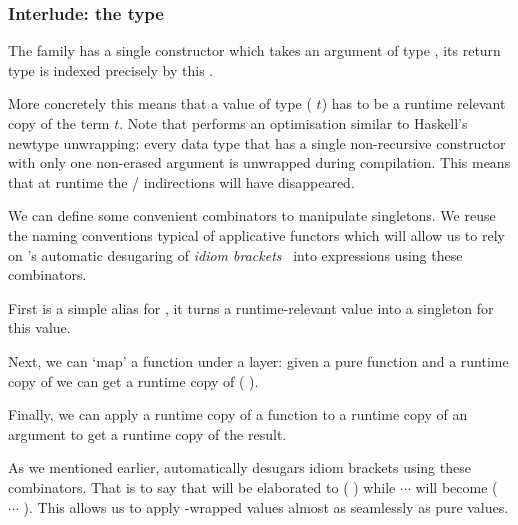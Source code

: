 
\subsubsection{Interlude: the  type}\label{sec:datasingleton}

The  family has a single constructor
which takes an argument  of type ,
its return type is indexed precisely by this .


More concretely this means that a value of type
( $t$) has to be a runtime relevant
copy of the term $t$.
%
Note that \idris{} performs an optimisation similar to Haskell's
newtype unwrapping: every data type that has a single
non-recursive constructor with only one non-erased argument
is unwrapped during compilation.
%
This means that at runtime the
 /  indirections
will have disappeared.

We can define some convenient combinators to manipulate
singletons.
%
We reuse the naming conventions typical of applicative
functors which will allow us to rely on \idris{}'s automatic
desugaring of \emph{idiom brackets}~\cite{DBLP:journals/jfp/McbrideP08}
into expressions using these combinators.


First  is a simple alias for ,
it turns a runtime-relevant value  into a singleton for
this value.


Next, we can `map' a function under a  layer: given
a pure function  and a runtime copy of  we
can get a runtime copy of ( ).


Finally, we can apply a runtime copy of a function to a runtime copy of
an argument to get a runtime copy of the result.

As we mentioned earlier, \idris{} automatically desugars idiom brackets
using these combinators. That is to say that
\IdrisKeyword{[|}  \IdrisKeyword{|]} will be elaborated to
( ) while
\IdrisKeyword{[|}   $\cdots$  \IdrisKeyword{|]}
will become
( \IdrisFunction{<\$>}  \IdrisFunction{<*>} $\cdots$ \IdrisFunction{<*>} ).
%
This allows us to apply -wrapped values almost as seamlessly as pure values.
